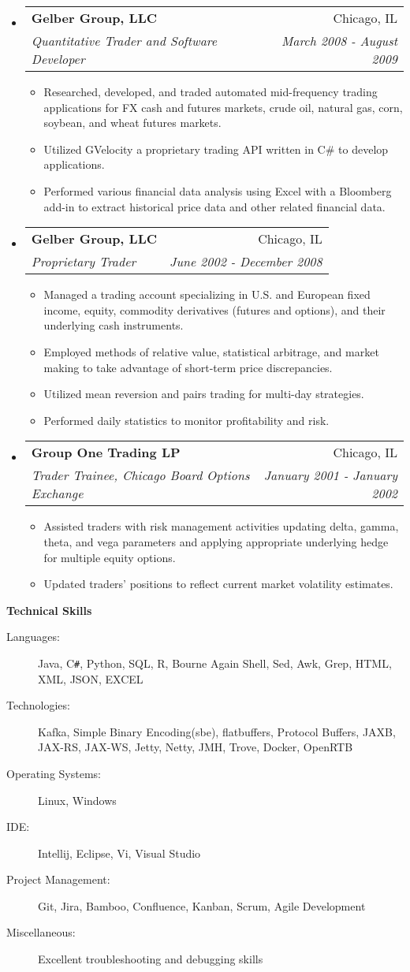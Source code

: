 \documentclass[letterpaper,10pt]{article}
\makeatletter
\newcommand{\resitem}[1]{\item #1 \vspace{-2pt}}
\newcommand{\resheading}[1]{{\large \colorbox{mygrey}{\begin{minipage}{\textwidth}{\textbf{#1 \vphantom{p\^{E}}}}\end{minipage}}}}
\newcommand{\ressubheading}[4]{
\begin{tabular*}{7.0in}{l@{\extracolsep{\fill}}r}
		\textbf{#1} & #2 \\
		\textit{#3} & \textit{#4} \\
\end{tabular*}\vspace{-6pt}}
\makeatother
\begin{document}
\begin{itemize}
\item
	\ressubheading{Gelber Group, LLC}{Chicago, IL}{Quantitative Trader and Software Developer}{March 2008 - August 2009}
	\begin{itemize}
		\resitem{Researched, developed, and traded automated mid-frequency trading applications for FX cash and 
   futures markets, crude oil, natural gas, corn, soybean, and wheat futures markets.}
		\resitem{Utilized GVelocity a proprietary trading API written in C\# to develop applications.}
		\resitem{Performed various financial data analysis using Excel with a Bloomberg add-in to extract historical price data and other related financial data.}
	\end{itemize}

\item
	\ressubheading{Gelber Group, LLC}{Chicago, IL}{Proprietary Trader}{June 2002 - December 2008}
	\begin{itemize}
		\resitem{Managed a trading account specializing in U.S. and European fixed income, equity, commodity
   derivatives (futures and options), and their underlying cash instruments.}
		\resitem{Employed methods of relative value, statistical arbitrage, and market making to take advantage 
   of short-term price discrepancies.}
		\resitem{Utilized mean reversion and pairs trading for multi-day strategies.}
		\resitem{Performed daily statistics to monitor profitability and risk. }
	\end{itemize}

\item
	\ressubheading{Group One Trading LP}{Chicago, IL}{Trader Trainee, Chicago Board Options Exchange}{January 2001 - January 2002}
	\begin{itemize}
		\resitem{Assisted traders with risk management activities updating delta, gamma, theta, and vega
  parameters and applying appropriate underlying hedge for multiple equity options.}
		\resitem{Updated traders’ positions to reflect current market volatility estimates.}
	\end{itemize}

\end{itemize}

\resheading{Technical Skills}

\begin{description}
\item[Languages:]
Java, C{}\verb!#!, Python, SQL, R, Bourne Again Shell, Sed, Awk, Grep, HTML, XML, JSON, EXCEL
\item[Technologies:]
Kafka, Simple Binary Encoding(sbe), flatbuffers, Protocol Buffers, JAXB, JAX-RS, JAX-WS, Jetty, Netty, JMH, Trove, Docker, OpenRTB
\item[Operating Systems:]
Linux, Windows
\item[IDE:]
Intellij, Eclipse, Vi, Visual Studio
\item[Project Management:]
Git, Jira, Bamboo, Confluence, Kanban, Scrum, Agile Development
\item[Miscellaneous:]
Excellent troubleshooting and debugging skills
\end{description}


\end{document}
